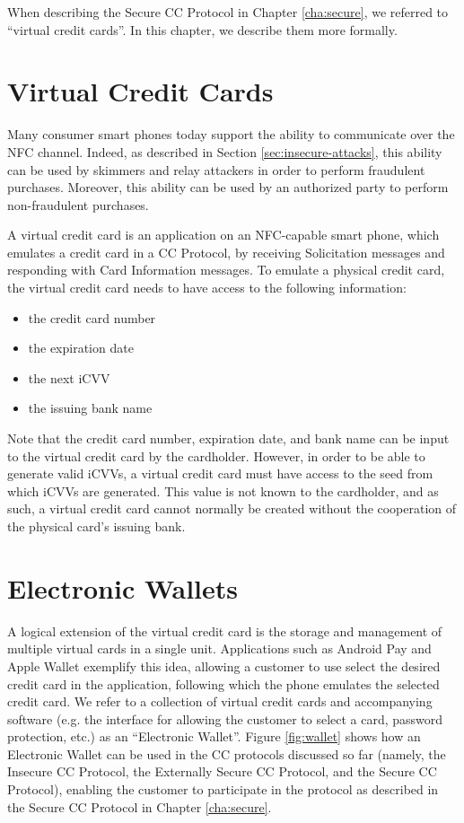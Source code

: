 When describing the Secure CC Protocol in Chapter \ref{cha:secure}, we referred to ``virtual credit cards''.
In this chapter, we describe them more formally.

\section{Virtual Credit Cards}

Many consumer smart phones today support the ability to communicate over the NFC channel.
Indeed, as described in Section \ref{sec:insecure-attacks}, this ability can be used by skimmers and relay attackers in order to perform fraudulent purchases.
Moreover, this ability can be used by an authorized party to perform non-fraudulent purchases.

A virtual credit card is an application on an NFC-capable smart phone, which emulates a credit card in a CC Protocol,
    by receiving Solicitation messages and responding with Card Information messages.
To emulate a physical credit card, the virtual credit card needs to have access to the following information:

\begin{itemize}
\item the credit card number
\item the expiration date
\item the next iCVV
\item the issuing bank name
\end{itemize}

Note that the credit card number, expiration date, and bank name can be input to the virtual credit card by the cardholder.
However, in order to be able to generate valid iCVVs, a virtual credit card must have access to the seed from which iCVVs are generated.
This value is not known to the cardholder, and as such, a virtual credit card cannot normally be created without the cooperation of the physical card's issuing bank.


\section{Electronic Wallets}
A logical extension of the virtual credit card is the storage and management of multiple virtual cards in a single unit.
Applications such as Android Pay and Apple Wallet exemplify this idea,
    allowing a customer to use select the desired credit card in the application,
    following which the phone emulates the selected credit card.
We refer to a collection of virtual credit cards and accompanying software
    (e.g. the interface for allowing the customer to select a card, password protection, etc.) as an ``Electronic Wallet''.
Figure \ref{fig:wallet} shows how an Electronic Wallet can be used in the CC protocols discussed so far
    (namely, the Insecure CC Protocol, the Externally Secure CC Protocol, and the Secure CC Protocol),
    enabling the customer to participate in the protocol as described in the Secure CC Protocol in Chapter \ref{cha:secure}.

